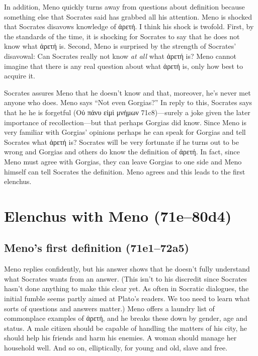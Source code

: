 \documentclass[12pt,letterpaper]{article}
\begin{document}
In addition, Meno quickly turns away from questions about definition because something else that Socrates said has grabbed all his attention. Meno is shocked that Socrates disavows knowledge of \textgreek{ἀρετή}. I think his shock is twofold. First, by the standards of the time, it is shocking for Socrates to say that he does not know what \textgreek{ἀρετή} is. Second, Meno is surprised by the strength of Socrates' disavowal: Can Socrates really not know \textit{at all} what \textgreek{ἀρετή} is? Meno cannot imagine that there is any real question about what \textgreek{ἀρετή} is, only how best to acquire it.

Socrates assures Meno that he doesn't know and that, moreover, he's never met anyone who does. Meno says ``Not even Gorgias?'' In reply to this, Socrates says that he he is forgetful (\textgreek{Οὐ πάνυ εἰμὶ μνήμων} 71c8)---surely a joke given the later importance of recollection—but that perhaps Gorgias did know. Since Meno is very familiar with Gorgias' opinions perhaps he can speak for Gorgias and tell Socrates what \textgreek{ἀρετή} is? Socrates will be very fortunate if he turns out to be wrong and Gorgias and others do know the definition of \textgreek{ἀρετή}. In fact, since Meno must agree with Gorgias, they can leave Gorgias to one side and Meno himself can tell Socrates the definition. Meno agrees and this leads to the first elenchus.

\section{Elenchus with Meno (71e--80d4)}

\subsection{Meno's first definition (71e1--72a5)}

Meno replies confidently, but his answer shows that he doesn't fully understand what Socrates wants from an answer. (This isn't to his discredit since Socrates hasn't done anything to make this clear yet. As often in Socratic dialogues, the initial fumble seems partly aimed at Plato's readers. We too need to learn what sorts of questions and answers matter.) Meno offers a laundry list of commonplace examples of \textgreek{ἀρετή}, and he breaks these down by gender, age and status. A male citizen should be capable of handling the matters of his city, he should help his friends and harm his enemies. A woman should manage her household well. And so on, elliptically, for young and old, slave and free.
\end{document}
